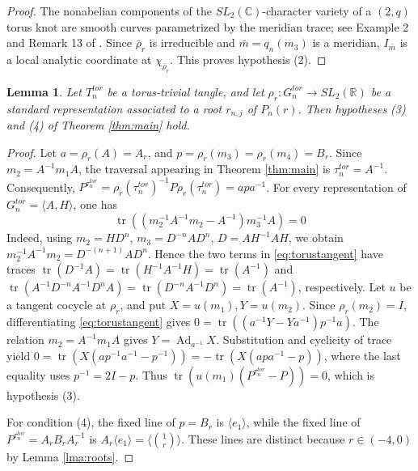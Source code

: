 \documentclass{article}
\DeclareMathOperator{\tr}{tr}
\newcommand{\Ad}{\operatorname{Ad}}
\theoremstyle{plain}
\theoremstyle{definition}
\theoremstyle{plain}
\theoremstyle{plain}
\theoremstyle{plain}
\newtheorem{lemma}[theorem]{Lemma}
\theoremstyle{remark}
\theoremstyle{remark}
\theoremstyle{plain}
\theoremstyle{plain}
\newcounter{main}
\theoremstyle{plain}
\theoremstyle{plain}
\begin{document}
\begin{proof}
The nonabelian components of the $SL_2(\mathbb C)$-character variety of a $(2, q)$ torus knot are smooth curves parametrized by the meridian trace; see Example 2 and Remark 13 of \cite{torus2q}. Since $\bar\rho_r$ is irreducible and $\bar m = q_n(m_3)$ is a meridian, $I_{\bar m}$ is a local analytic coordinate at $\chi_{\bar\rho_r}$. This proves hypothesis (2). 
\end{proof}

\begin{lemma}\label{lma:torustrivial34}
Let $T_n^{tor}$ be a torus-trivial tangle, and let $\rho_r: G_n^{tor} \to SL_2(\mathbb{R})$ be a standard representation associated to a root $r_{n,j}$ of $P_n(r)$. Then hypotheses (3) and (4) of Theorem \ref{thm:main} hold. 
\end{lemma}

\begin{proof}
Let $a = \rho_r(A) = A_r$, and $p = \rho_r(m_3) = \rho_r(m_4) = B_r$. Since $m_2 = A^{-1}m_1A$, the traversal appearing in Theorem \ref{thm:main} is $\tau_n^{tor}=A^{-1}$. Consequently, $P^{\tau_n^{tor}}=\rho_r(\tau_n^{tor})^{-1}P\rho_r(\tau_n^{tor})=apa^{-1}$. 
For every representation of $G_n^{tor} = \langle A, H \rangle$, one has 
\begin{equation}\label{eq:torustangent}
	\tr((m_2^{-1}A^{-1}m_2-A^{-1})m_3^{-1}A) = 0
\end{equation}
Indeed, using $m_2=HD^n$, $m_3 = D^{-n}AD^n$, $D = AH^{-1}AH$, we obtain $m_2^{-1}A^{-1}m_2=D^{-(n+1)}AD^n$. Hence the two terms in \eqref{eq:torustangent} have traces $\tr(D^{-1}A)=\tr(H^{-1}A^{-1}H)=\tr(A^{-1})$ and $\tr(A^{-1}D^{-n}A^{-1}D^nA)=\tr(D^{-n}A^{-1}D^n)=\tr(A^{-1})$, respectively. Let $u$ be a tangent cocycle at $\rho_r$, and put $X=u(m_1), Y=u(m_2)$. Since $\rho_r(m_2)=I$, differentiating \eqref{eq:torustangent} gives $0=\tr((a^{-1}Y-Ya^{-1})p^{-1}a)$. The relation $m_2=A^{-1}m_1A$ gives $Y=\Ad_{a^{-1}}X$. Substitution and cyclicity of trace yield $0=\tr(X(ap^{-1}a^{-1}-p^{-1})) = -\tr(X(apa^{-1}-p))$, where the last equality uses $p^{-1}=2I-p$. Thus $\tr(u(m_1)(P^{\tau_n^{tor}}-P))=0$, which is hypothesis (3). 

\medskip

For condition (4), the fixed line of $p=B_r$ is $\langle e_1 \rangle$, while the fixed line of $P^{\tau_n^{tor}}=A_rB_rA_r^{-1}$ is $A_r\langle e_1\rangle = \langle \binom{1}{r} \rangle$. These lines are distinct because $r \in (-4, 0)$ by Lemma \ref{lma:roots}. 
\end{proof}
\end{document}
